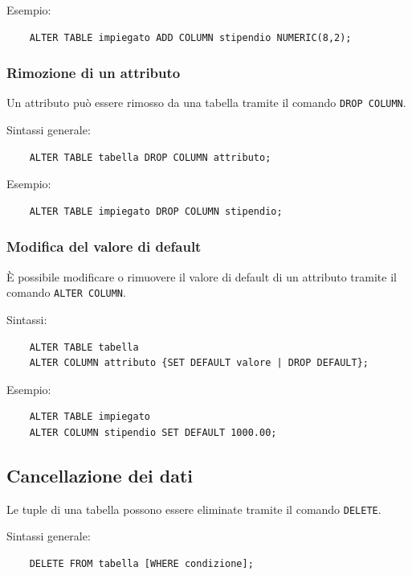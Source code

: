 Esempio:

\begin{verbatim}
	ALTER TABLE impiegato ADD COLUMN stipendio NUMERIC(8,2);
\end{verbatim}

\subsubsection*{Rimozione di un attributo}

Un attributo può essere rimosso da una tabella tramite il comando
\texttt{DROP COLUMN}.

Sintassi generale:

\begin{verbatim}
	ALTER TABLE tabella DROP COLUMN attributo;
\end{verbatim}

Esempio:

\begin{verbatim}
	ALTER TABLE impiegato DROP COLUMN stipendio;
\end{verbatim}

\subsubsection*{Modifica del valore di default}

È possibile modificare o rimuovere il valore di default di un attributo
tramite il comando \texttt{ALTER COLUMN}.

Sintassi:

\begin{verbatim}
	ALTER TABLE tabella 
	ALTER COLUMN attributo {SET DEFAULT valore | DROP DEFAULT};
\end{verbatim}

Esempio:

\begin{verbatim}
	ALTER TABLE impiegato 
	ALTER COLUMN stipendio SET DEFAULT 1000.00;
\end{verbatim}

\subsection{Cancellazione dei dati}

Le tuple di una tabella possono essere eliminate tramite il comando
\texttt{DELETE}.

Sintassi generale:

\begin{verbatim}
	DELETE FROM tabella [WHERE condizione];
\end{verbatim}

